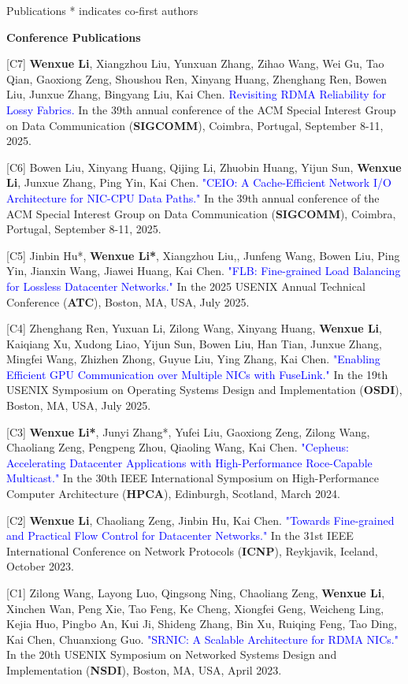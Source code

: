 \documentclass{resume} %
\newcommand{\blue}[1]{\textcolor{blue}{#1}}
\begin{document}
\begin{rSection}{Publications}
* indicates co-first authors 

\textbf{Conference Publications}

[C7] \textbf{Wenxue Li}, Xiangzhou Liu, Yunxuan Zhang, Zihao Wang, Wei Gu, Tao Qian, Gaoxiong Zeng, Shoushou Ren, Xinyang Huang, Zhenghang Ren, Bowen Liu, Junxue Zhang, Bingyang Liu, Kai Chen. \blue{Revisiting RDMA Reliability for Lossy Fabrics.} In the 39th annual conference of the ACM Special Interest Group on Data Communication (\textbf{SIGCOMM}), Coimbra, Portugal, September 8-11, 2025.

[C6] Bowen Liu, Xinyang Huang, Qijing Li, Zhuobin Huang, Yijun Sun, \textbf{Wenxue Li}, Junxue Zhang, Ping Yin, Kai Chen. \blue{"CEIO: A Cache-Efficient Network I/O Architecture for NIC-CPU Data Paths."} In the 39th annual conference of the ACM Special Interest Group on Data Communication (\textbf{SIGCOMM}), Coimbra, Portugal, September 8-11, 2025.

[C5] Jinbin Hu*, \textbf{Wenxue Li*}, Xiangzhou Liu,, Junfeng Wang, Bowen Liu, Ping Yin, Jianxin Wang, Jiawei Huang, Kai Chen. \blue{"FLB: Fine-grained Load Balancing for Lossless Datacenter Networks."} In the 2025 USENIX Annual Technical Conference (\textbf{ATC}), Boston, MA, USA, July 2025.

[C4] Zhenghang Ren, Yuxuan Li, Zilong Wang, Xinyang Huang, \textbf{Wenxue Li}, Kaiqiang Xu, Xudong Liao, Yijun Sun, Bowen Liu, Han Tian, Junxue Zhang, Mingfei Wang, Zhizhen Zhong, Guyue Liu, Ying Zhang, Kai Chen. \blue{"Enabling Efficient GPU Communication over Multiple NICs with FuseLink."} In the 19th USENIX Symposium on Operating Systems Design and Implementation (\textbf{OSDI}), Boston, MA, USA, July 2025.

[C3] \textbf{Wenxue Li*}, Junyi Zhang*, Yufei Liu, Gaoxiong Zeng, Zilong Wang, Chaoliang Zeng, Pengpeng Zhou, Qiaoling Wang, Kai Chen. \blue{"Cepheus: Accelerating Datacenter Applications with High-Performance Roce-Capable Multicast."} In the 30th IEEE International Symposium on High-Performance Computer Architecture (\textbf{HPCA}), Edinburgh, Scotland, March 2024.

[C2] \textbf{Wenxue Li}, Chaoliang Zeng, Jinbin Hu, Kai Chen. \blue{"Towards Fine-grained and Practical Flow Control for Datacenter Networks."} In the 31st IEEE International Conference on Network Protocols (\textbf{ICNP}), Reykjavik, Iceland, October 2023.

[C1] Zilong Wang, Layong Luo, Qingsong Ning, Chaoliang Zeng, \textbf{Wenxue Li}, Xinchen Wan, Peng Xie, Tao Feng, Ke Cheng, Xiongfei Geng, Weicheng Ling, Kejia Huo, Pingbo An, Kui Ji, Shideng Zhang, Bin Xu, Ruiqing Feng, Tao Ding, Kai Chen, Chuanxiong Guo. \blue{"SRNIC: A Scalable Architecture for RDMA NICs."} In the 20th USENIX Symposium on Networked Systems Design and Implementation (\textbf{NSDI}), Boston, MA, USA, April 2023.


\end{rSection}
\end{document}
